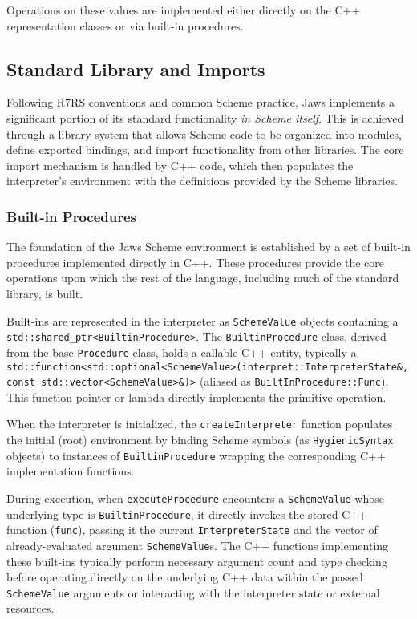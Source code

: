 \documentclass[final]{cmpreport_02}
\begin{document}
Operations on these values are implemented either directly on the C++ representation classes or via built-in procedures.

\subsection{Standard Library and Imports}

Following R7RS conventions and common Scheme practice, Jaws implements a significant portion of its standard functionality \textit{in Scheme itself}. This is achieved through a library system that allows Scheme code to be organized into modules, define exported bindings, and import functionality from other libraries. The core import mechanism is handled by C++ code, which then populates the interpreter's environment with the definitions provided by the Scheme libraries.

\subsubsection{Built-in Procedures}

The foundation of the Jaws Scheme environment is established by a set of built-in procedures implemented directly in C++. These procedures provide the core operations upon which the rest of the language, including much of the standard library, is built.

Built-ins are represented in the interpreter as \texttt{SchemeValue} objects containing a \texttt{std::shared\_ptr<BuiltinProcedure>}. The \texttt{BuiltinProcedure} class, derived from the base \texttt{Procedure} class, holds a callable C++ entity, typically a \texttt{std::function<std::optional<SchemeValue>(interpret::InterpreterState\&, const std::vector<SchemeValue>\&)>} (aliased as \texttt{BuiltInProcedure::Func}). This function pointer or lambda directly implements the primitive operation.

When the interpreter is initialized, the \texttt{createInterpreter} function populates the initial (root) environment by binding Scheme symbols (as \texttt{HygienicSyntax} objects) to instances of \texttt{BuiltinProcedure} wrapping the corresponding C++ implementation functions.

During execution, when \texttt{executeProcedure} encounters a \texttt{SchemeValue} whose underlying type is \texttt{BuiltinProcedure}, it directly invokes the stored C++ function (\texttt{func}), passing it the current \texttt{InterpreterState} and the vector of already-evaluated argument \texttt{SchemeValue}s. The C++ functions implementing these built-ins typically perform necessary argument count and type checking before operating directly on the underlying C++ data within the passed \texttt{SchemeValue} arguments or interacting with the interpreter state or external resources.
\end{document}
